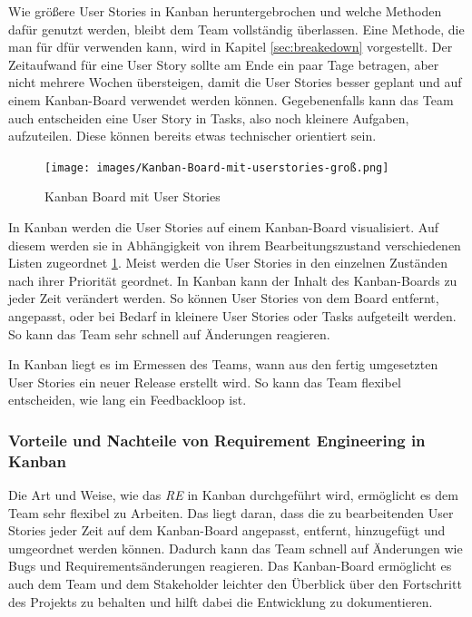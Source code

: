 \documentclass[acmtog]{acmart}
\begin{document}
Wie größere User Stories in Kanban heruntergebrochen und welche Methoden dafür genutzt werden, bleibt 
dem Team vollständig überlassen. Eine Methode, die man für dfür verwenden kann, wird in Kapitel \ref{sec:breakedown} vorgestellt. 
Der Zeitaufwand für eine User Story sollte am Ende ein paar Tage betragen, aber nicht mehrere Wochen übersteigen, damit die User Stories besser 
geplant und auf einem Kanban-Board verwendet werden können. Gegebenenfalls kann das Team auch entscheiden eine User Story in Tasks, also noch 
kleinere Aufgaben, aufzuteilen. Diese können bereits etwas technischer orientiert sein. \cite{agileprocesses}

\begin{figure}[t]
  \centering
  \texttt{[image: images/Kanban-Board-mit-userstories-groß.png]}
  \caption{Kanban Board mit User Stories}
    \label{fig:kanban-board}
  \Description{}
\end{figure}

In Kanban werden die User Stories auf einem Kanban-Board visualisiert. Auf diesem werden sie in Abhängigkeit von 
ihrem Bearbeitungszustand verschiedenen Listen zugeordnet \ref{fig:kanban-board}. Meist werden die User Stories in den einzelnen 
Zuständen nach ihrer Priorität geordnet. In Kanban kann der Inhalt des Kanban-Boards zu jeder Zeit verändert werden. 
So können User Stories von dem Board entfernt, angepasst, oder bei Bedarf in kleinere User Stories oder Tasks aufgeteilt werden. So kann das Team sehr schnell 
auf Änderungen reagieren. \cite{agileprocesses}

In Kanban liegt es im Ermessen des Teams, wann aus den fertig umgesetzten User Stories ein neuer Release 
erstellt wird. So kann das Team flexibel entscheiden, wie lang ein Feedbackloop ist. \cite{agileprocesses}

\subsubsection{Vorteile und Nachteile von Requirement Engineering in Kanban}

Die Art und Weise, wie das \emph{RE} in Kanban durchgeführt wird, ermöglicht es dem Team sehr flexibel zu Arbeiten. 
Das liegt daran, dass die zu bearbeitenden User Stories jeder Zeit auf dem Kanban-Board angepasst, entfernt, 
hinzugefügt und umgeordnet werden können. Dadurch kann das Team schnell auf Änderungen wie Bugs und Requirementsänderungen 
reagieren. Das Kanban-Board ermöglicht es auch dem Team und dem Stakeholder leichter den Überblick über den 
Fortschritt des Projekts zu behalten und hilft dabei die Entwicklung zu dokumentieren.
\end{document}
